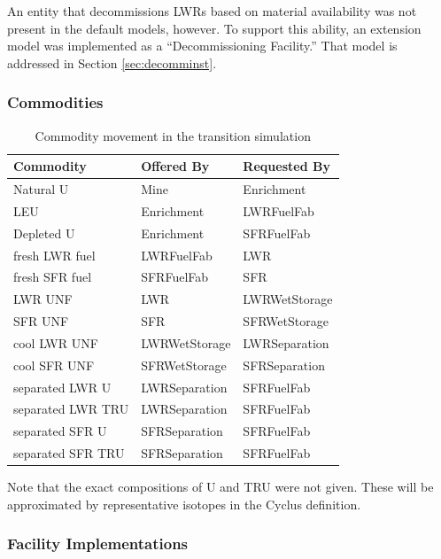 An entity that decommissions LWRs based on material availability was not 
present in the default models, however. To support this ability, an extension 
model was implemented as a ``Decommissioning Facility.'' That model is 
addressed in Section \ref{sec:decomminst}.

\subsubsection{Commodities}

\begin{table}[htbp]
\centering
\begin{tabular}{|l|l|l|}
\hline
Commodity  &     Offered By  &    Requested By \\
\hline
Natural  U & Mine & Enrichment \\ 
LEU & Enrichment & LWRFuelFab \\ 
Depleted U & Enrichment & SFRFuelFab \\ 
fresh LWR fuel & LWRFuelFab & LWR \\ 
fresh SFR fuel & SFRFuelFab & SFR \\ 
LWR UNF & LWR & LWRWetStorage \\ 
SFR UNF & SFR & SFRWetStorage \\ 
cool LWR UNF & LWRWetStorage & LWRSeparation \\ 
cool SFR UNF & SFRWetStorage & SFRSeparation \\ 
separated LWR U & LWRSeparation & SFRFuelFab \\ 
separated LWR TRU & LWRSeparation & SFRFuelFab \\ 
separated SFR U & SFRSeparation & SFRFuelFab \\ 
separated SFR TRU & SFRSeparation & SFRFuelFab \\ 
\hline
\end{tabular}
\caption{Commodity movement in the transition simulation}
\label{tab:commods}
\end{table}

Note that the exact compositions of U and TRU were not given. These will be
approximated by representative isotopes in the Cyclus definition.


\subsubsection{Facility Implementations}


